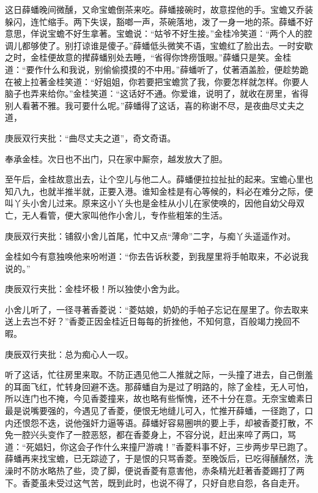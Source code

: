 \begin{parag}


    这日薛蟠晚间微醺，又命宝蟾倒茶来吃。薛蟠接碗时，故意捏他的手。宝蟾又乔装躲闪，连忙缩手。两下失误，豁啷一声，茶碗落地，泼了一身一地的茶。薛蟠不好意思，佯说宝蟾不好生拿著。宝蟾说：“姑爷不好生接。”金桂冷笑道：“两个人的腔调儿都够使了。别打谅谁是傻子。”薛蟠低头微笑不语，宝蟾红了脸出去。一时安歇之时，金桂便故意的撵薛蟠别处去睡，“省得你馋痨饿眼。”薛蟠只是笑。金桂道：“要作什么和我说，别偷偷摸摸的不中用。”薛蟠听了，仗著酒盖脸，便趁势跪在被上拉著金桂笑道：“好姐姐，你若要把宝蟾赏了我，你要怎样就怎样。你要人脑子也弄来给你。”金桂笑道：“这话好不通。你爱谁，说明了，就收在房里，省得别人看著不雅。我可要什么呢。”薛蟠得了这话，喜的称谢不尽，是夜曲尽丈夫之道，\begin{note}庚辰双行夹批：“曲尽丈夫之道”，奇文奇语。\end{note}奉承金桂。次日也不出门，只在家中厮奈，越发放大了胆。
\end{parag}


\begin{parag}


    至午后，金桂故意出去，让个空儿与他二人。薛蟠便拉拉扯扯的起来。宝蟾心里也知八九，也就半推半就，正要入港。谁知金桂是有心等候的，料必在难分之际，便叫丫头小舍儿过来。原来这小丫头也是金桂从小儿在家使唤的，因他自幼父母双亡，无人看管，便大家叫他作小舍儿，专作些粗笨的生活。\begin{note}庚辰双行夹批：铺叙小舍儿首尾，忙中又点“薄命”二字，与痴丫头遥遥作对。\end{note}金桂如今有意独唤他来吩咐道：“你去告诉秋菱，到我屋里将手帕取来，不必说我说的。”\begin{note}庚辰双行夹批：金桂坏极！所以独使小舍为此。\end{note}小舍儿听了，一径寻著香菱说：“菱姑娘，奶奶的手帕子忘记在屋里了。你去取来送上去岂不好？”香菱正因金桂近日每每的折挫他，不知何意，百般竭力挽回不暇。\begin{note}庚辰双行夹批：总为痴心人一叹。\end{note}听了这话，忙往房里来取。不防正遇见他二人推就之际，一头撞了进去，自己倒羞的耳面飞红，忙转身回避不迭。那薛蟠自为是过了明路的，除了金桂，无人可怕，所以连门也不掩，今见香菱撞来，故也略有些惭愧，还不十分在意。无奈宝蟾素日最是说嘴要强的，今遇见了香菱，便恨无地缝儿可入，忙推开薛蟠，一径跑了，口内还恨怨不迭，说他强奸力逼等语。薛蟠好容易圈哄的要上手，却被香菱打散，不免一腔兴头变作了一腔恶怒，都在香菱身上，不容分说，赶出来啐了两口，骂道：“死娼妇，你这会子作什么来撞尸游魂！”香菱料事不好，三步两步早已跑了。薛蟠再来找宝蟾，已无踪迹了，于是恨的只骂香菱。至晚饭后，已吃得醺醺然，洗澡时不防水略热了些，烫了脚，便说香菱有意害他，赤条精光赶著香菱踢打了两下。香菱虽未受过这气苦，既到此时，也说不得了，只好自悲自怨，各自走开。
\end{parag}


